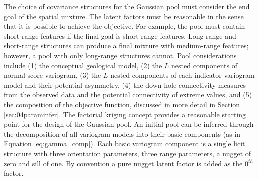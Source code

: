 The choice of covariance structures for the Gaussian pool must consider the end goal of the spatial mixture. The latent factors must be reasonable in the sense that it is possible to achieve the objective. For example, the pool must contain short-range features if the final goal is short-range features. Long-range and short-range structures can produce a final mixture with medium-range features; however, a pool with only long-range structures cannot. Pool considerations include (1) the conceptual geological model, (2) the $L$ nested components of normal score variogram, (3) the $L$ nested components of each indicator variogram model and their potential asymmetry, (4) the down hole connectivity measures from the observed data and the potential connectivity of extreme values, and (5) the composition of the objective function, discussed in more detail in Section \ref{sec:04paraminfer}. The factorial kriging concept provides a reasonable starting point for the design of the Gaussian pool. An initial pool can be inferred through the decomposition of all variogram models into their basic components (as in Equation \ref{eq:gamma_comp}). Each basic variogram component is a single licit structure with three orientation parameters, three range parameters, a nugget of zero and sill of one. By convention a pure nugget latent factor is added as the $0^{th}$ factor.

